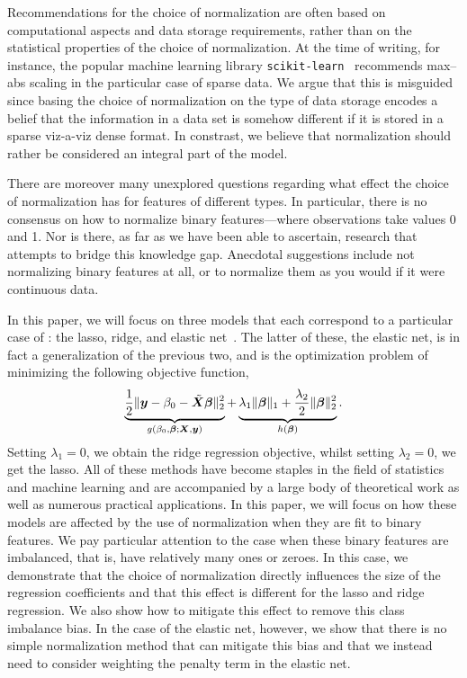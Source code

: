 Recommendations for the choice of normalization are often based on computational aspects
and data storage requirements, rather than on the statistical properties of the choice of
normalization. At the time of writing, for instance, the popular machine learning library
\texttt{scikit-learn}~\citep{scikit-learndevelopers2024} recommends max--abs scaling in the
particular case of sparse data. We argue that this is misguided since basing the choice of
normalization on the type of data storage encodes a belief that the information in a data
set is somehow different if it is stored in a sparse viz-a-viz dense format. In constrast,
we believe that normalization should rather be considered an integral part of the model.

There are moreover many unexplored questions regarding what effect the choice of
normalization has for features of different types. In particular, there is no consensus on
how to normalize binary features---where observations take values 0 and 1. Nor is there, as
far as we have been able to ascertain, research that attempts to bridge this knowledge gap.
Anecdotal suggestions include not normalizing binary features at all, or to normalize them
as you would if it were continuous data.

In this paper, we will focus on three models that each correspond to a particular case of
: the lasso, ridge, and elastic net~\citep{zou2005}. The latter
of these, the elastic net, is in fact a generalization of the previous two, and is the
optimization problem of minimizing the following objective function,
%
\begin{equation*}
  \underbrace{\frac{1}{2} \lVert \boldsymbol y - \beta_0 - \tilde{\boldsymbol{X}}\boldsymbol{\beta} \rVert^2_2}_{g(\beta_0, \boldsymbol{\beta}; \boldsymbol{X}, \boldsymbol{y})}  + \underbrace{\lambda_1 \lVert \boldsymbol\beta \rVert_1 + \frac{\lambda_2}{2}\lVert \boldsymbol \beta \rVert_2^2}_{h(\boldsymbol{\beta})}.
\end{equation*}
%
Setting \(\lambda_1 = 0\), we obtain the ridge regression objective, whilst setting
\(\lambda_2 = 0\), we get the lasso. All of these methods have become staples in the field
of statistics and machine learning and are accompanied by a large body of theoretical work
as well as numerous practical applications. In this paper, we will focus on how these
models are affected by the use of normalization when they are fit to binary features. We
pay particular attention to the case when these binary features are imbalanced, that is,
have relatively many ones or zeroes. In this case, we demonstrate that the choice of
normalization directly influences the size of the regression coefficients and that this
effect is different for the lasso and ridge regression. We also show how to mitigate this
effect to remove this class imbalance bias. In the case of the elastic net, however, we
show that there is no simple normalization method that can mitigate this bias and that we
instead need to consider weighting the penalty term in the elastic net.

